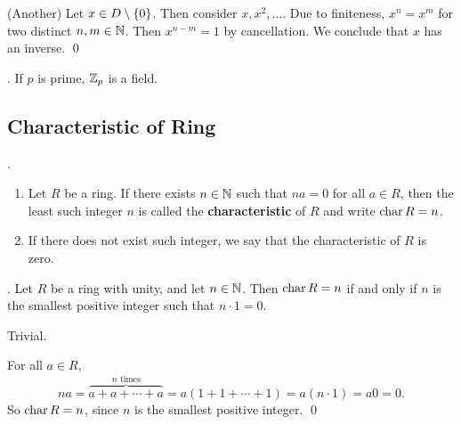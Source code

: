 \pf (Another) Let \(x \in D \setminus \{0\}\). Then consider \(x, x^2, \dots\). Due to finiteness, \(x^n = x^m\) for two distinct \(n, m \in \mathbb{N}\). Then \(x^{n-m} = 1\) by cancellation. We conclude that \(x\) has an inverse. \qed

\cor. If \(p\) is prime, \(\mathbb{Z}_p\) is a field.

\pagebreak

\subsection*{Characteristic of Ring}

. 
\begin{enumerate}
    \item Let \(R\) be a ring. If there exists \(n \in \mathbb{N}\) such that \(na = 0\) for all \(a \in R\), then the least such integer \(n\) is called the \textbf{characteristic} of \(R\) and write \(\operatorname{char} R = n\).
    \item If there does not exist such integer, we say that the characteristic of \(R\) is zero.
\end{enumerate}

\thm. Let \(R\) be a ring with unity, and let \(n \in \mathbb{N}\). Then \(\operatorname{char} R = n\) if and only if \(n\) is the smallest positive integer such that \(n \cdot 1 = 0\).

\pf \note{\mimp} Trivial.

\note{\mimpd} For all \(a \in R\),
\[
    na = \overbrace{a + a + \cdots + a}^{n \text{ times}} = a(1 + 1 + \cdots + 1) = a(n \cdot 1) = a0 = 0.
\]
So \(\operatorname{char} R = n\), since \(n\) is the smallest positive integer. \qed

\pagebreak
